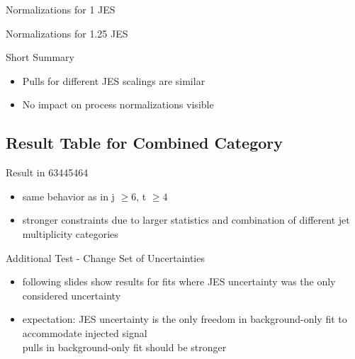 \begin{frame}{Normalizations for \num[round-precision=2]{1} JES}
\begin{scriptsize}

\end{scriptsize}
\end{frame}

\begin{frame}{Normalizations for \num[round-precision=2]{1.25} JES}
\begin{scriptsize}

\end{scriptsize}
\end{frame}

\begin{frame}{Short Summary}
\begin{itemize}
\item Pulls for different JES scalings are similar
\item No impact on process normalizations visible
\end{itemize}
\end{frame}

\subsection{Result Table for Combined Category}
\begin{frame}{Result in 63445464}

\begin{itemize}
\item same behavior as in j $\geq 6$, t $\geq 4$
\item stronger constraints due to larger statistics and combination of different jet multiplicity categories
\end{itemize}
\end{frame}

\begin{frame}{Additional Test - Change Set of Uncertainties}
\begin{itemize}
\item following slides show results for fits where JES uncertainty was the only considered uncertainty
\item expectation: JES uncertainty is the only freedom in background-only fit to accommodate injected signal\\
\rar pulls in background-only fit should be stronger
\end{itemize}
\end{frame}


